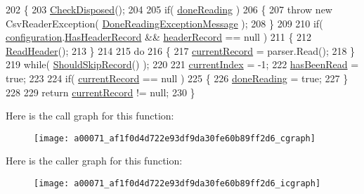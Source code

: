 \begin{DoxyCode}
202         \{
203             \hyperlink{a00071_a6fa45a46ed1322dc1872ca2321b5edbc}{CheckDisposed}();
204 
205             \textcolor{keywordflow}{if}( \hyperlink{a00071_a04a4a668ae50f5383cdd2a1691bbd718}{doneReading} )
206             \{
207                 \textcolor{keywordflow}{throw} \textcolor{keyword}{new} CsvReaderException( \hyperlink{a00071_abea2bd0359f517019984de31f9d9fb96}{DoneReadingExceptionMessage} );
208             \}
209 
210             \textcolor{keywordflow}{if}( \hyperlink{a00071_a695622911e45cbac8d67dcbd9a3e2967}{configuration}.\hyperlink{a00057_a9e439f90bfac500d24d6e2e731240439}{HasHeaderRecord} && 
      \hyperlink{a00071_aa6e5fd8aa2961442ca1caf7a4ac54d65}{headerRecord} == null )
211             \{
212                 \hyperlink{a00071_a57ba5fa523de97bd2cf068973329090d}{ReadHeader}();
213             \}
214 
215             \textcolor{keywordflow}{do}
216             \{
217                 \hyperlink{a00071_ab2bfef15784add66e441c9d3a0d73751}{currentRecord} = parser.Read();
218             \} 
219             \textcolor{keywordflow}{while}( \hyperlink{a00071_a3b8db0163b61e20d56ed8626e21338d6}{ShouldSkipRecord}() );
220 
221             \hyperlink{a00071_a56e974bc7e2242912e956393e831e166}{currentIndex} = -1;
222             \hyperlink{a00071_a34d0725235d140229f6a07e4c3b83552}{hasBeenRead} = \textcolor{keyword}{true};
223 
224             \textcolor{keywordflow}{if}( \hyperlink{a00071_ab2bfef15784add66e441c9d3a0d73751}{currentRecord} == null )
225             \{
226                 \hyperlink{a00071_a04a4a668ae50f5383cdd2a1691bbd718}{doneReading} = \textcolor{keyword}{true};
227             \}
228 
229             \textcolor{keywordflow}{return} \hyperlink{a00071_ab2bfef15784add66e441c9d3a0d73751}{currentRecord} != null;
230         \}
\end{DoxyCode}


Here is the call graph for this function\-:
\nopagebreak
\begin{figure}[H]
\begin{center}
\leavevmode
\texttt{[image: a00071\_af1f0d4d722e93df9da30fe60b89ff2d6\_cgraph]}
\end{center}
\end{figure}




Here is the caller graph for this function\-:
\nopagebreak
\begin{figure}[H]
\begin{center}
\leavevmode
\texttt{[image: a00071\_af1f0d4d722e93df9da30fe60b89ff2d6\_icgraph]}
\end{center}
\end{figure}


